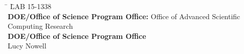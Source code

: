 \bigskip

\begin{tabbing}
\hspace*{10mm} \=  \= LAB 15-1338 \\
\> \textbf{DOE/Office of Science Program Office:} \> Office of Advanced Scientific Computing Research\\
\> \textbf{DOE/Office of Science Program Office}  \> \\
\>  \> Lucy Nowell\\
\end{tabbing}

\medskip


\newpage
